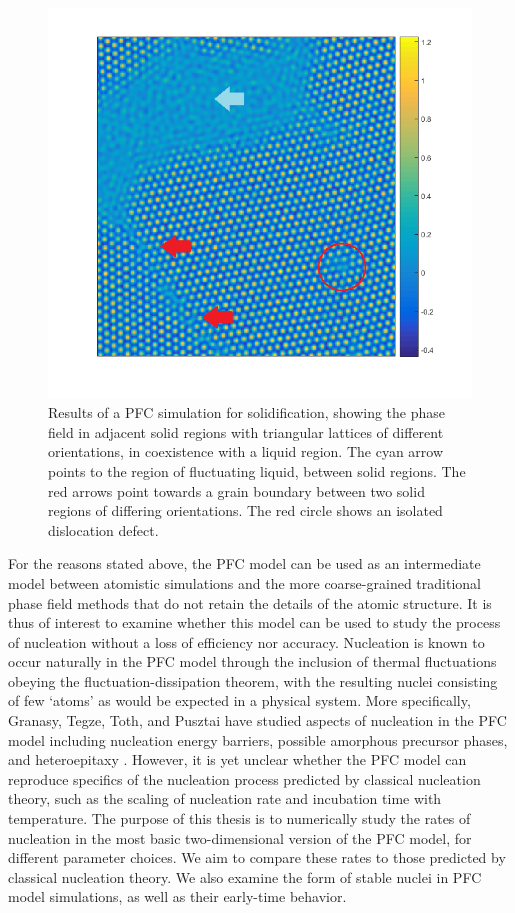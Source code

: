 \begin{figure}[!ht]
\centering
\includegraphics[width=1\textwidth]{fig_pfc/pfc_example_mod2.png}
\caption{Results of a PFC simulation for solidification, showing the phase field in adjacent solid regions with triangular lattices of different orientations, in coexistence with a liquid region. The cyan arrow points to the region of fluctuating liquid, between solid regions. The red arrows point towards a grain boundary between two solid regions of differing orientations. The red circle shows an isolated dislocation defect.}\label{fig:pfc_example}
\end{figure}

For the reasons stated above, the PFC model can be used as an intermediate model between atomistic simulations and the more coarse-grained traditional phase field methods that do not retain the details of the atomic structure. It is thus of interest to examine whether this model can be used to study the process of nucleation without a loss of efficiency nor accuracy. Nucleation is known to occur naturally in the PFC model through the inclusion of thermal fluctuations obeying the fluctuation-dissipation theorem, with the resulting nuclei consisting of few `atoms' as would be expected in a physical system. More specifically, Granasy, Tegze, Toth, and Pusztai have studied aspects of nucleation in the PFC model including nucleation energy barriers, possible amorphous precursor phases, and heteroepitaxy \cite{toth10,toth11}. However, it is yet unclear whether the PFC model can reproduce specifics of the nucleation process predicted by classical nucleation theory, such as the scaling of nucleation rate and incubation time with temperature. The purpose of this thesis is to numerically study the rates of nucleation in the most basic two-dimensional version of the PFC model, for different parameter choices. We aim to compare these rates to those predicted by classical nucleation theory. We also examine the form of stable nuclei in PFC model simulations, as well as their early-time behavior.

